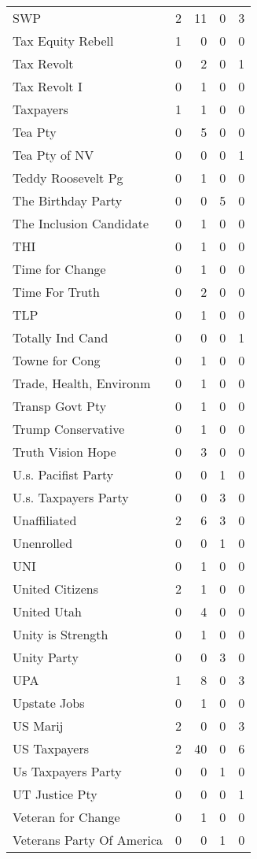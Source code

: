 \begin{supertabular}{lrrrr}
SWP & 2 & 11 & 0 & 3\\
Tax Equity Rebell & 1 & 0 & 0 & 0\\
Tax Revolt & 0 & 2 & 0 & 1\\
Tax Revolt I & 0 & 1 & 0 & 0\\
Taxpayers & 1 & 1 & 0 & 0\\
Tea Pty & 0 & 5 & 0 & 0\\
Tea Pty of NV & 0 & 0 & 0 & 1\\
Teddy Roosevelt Pg & 0 & 1 & 0 & 0\\
The Birthday Party & 0 & 0 & 5 & 0\\
The Inclusion Candidate & 0 & 1 & 0 & 0\\
THI & 0 & 1 & 0 & 0\\
Time for Change & 0 & 1 & 0 & 0\\
Time For Truth & 0 & 2 & 0 & 0\\
TLP & 0 & 1 & 0 & 0\\
Totally Ind Cand & 0 & 0 & 0 & 1\\
Towne for Cong & 0 & 1 & 0 & 0\\
Trade, Health, Environm & 0 & 1 & 0 & 0\\
Transp Govt Pty & 0 & 1 & 0 & 0\\
Trump Conservative & 0 & 1 & 0 & 0\\
Truth Vision Hope & 0 & 3 & 0 & 0\\
U.s. Pacifist Party & 0 & 0 & 1 & 0\\
U.s. Taxpayers Party & 0 & 0 & 3 & 0\\
Unaffiliated & 2 & 6 & 3 & 0\\
Unenrolled & 0 & 0 & 1 & 0\\
UNI & 0 & 1 & 0 & 0\\
United Citizens & 2 & 1 & 0 & 0\\
United Utah & 0 & 4 & 0 & 0\\
Unity is Strength & 0 & 1 & 0 & 0\\
Unity Party & 0 & 0 & 3 & 0\\
UPA & 1 & 8 & 0 & 3\\
Upstate Jobs & 0 & 1 & 0 & 0\\
US Marij & 2 & 0 & 0 & 3\\
US Taxpayers & 2 & 40 & 0 & 6\\
Us Taxpayers Party & 0 & 0 & 1 & 0\\
UT Justice Pty & 0 & 0 & 0 & 1\\
Veteran for Change & 0 & 1 & 0 & 0\\
Veterans Party Of America & 0 & 0 & 1 & 0\\

\end{supertabular}
